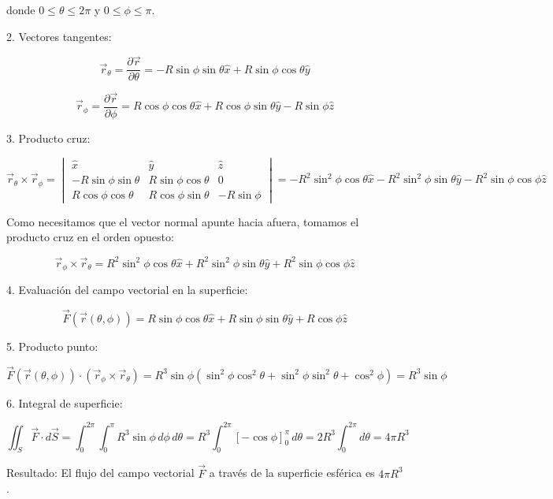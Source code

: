 \documentclass{article}
\begin{document}
donde $0 \le \theta \le 2\pi$ y $0 \le \phi \le \pi$.

2. Vectores tangentes:

\[
\vec{r}_\theta = \frac{\partial \vec{r}}{\partial \theta} = -R\sin\phi\sin\theta\hat{x} + R\sin\phi\cos\theta\hat{y}
\]

\[
\vec{r}_\phi = \frac{\partial \vec{r}}{\partial \phi} = R\cos\phi\cos\theta\hat{x} + R\cos\phi\sin\theta\hat{y} - R\sin\phi\hat{z}
\]

3. Producto cruz:

\[
\vec{r}_\theta \times \vec{r}_\phi =  \begin{vmatrix}
\hat{x} & \hat{y} & \hat{z} \\
-R\sin\phi\sin\theta & R\sin\phi\cos\theta & 0 \\
R\cos\phi\cos\theta & R\cos\phi\sin\theta & -R\sin\phi
\end{vmatrix} = -R^2\sin^2\phi\cos\theta\hat{x} - R^2\sin^2\phi\sin\theta\hat{y} - R^2\sin\phi\cos\phi\hat{z}
\]

Como necesitamos que el vector normal apunte hacia afuera, tomamos el producto cruz en el orden opuesto:

\[
\vec{r}_\phi \times \vec{r}_\theta = R^2\sin^2\phi\cos\theta\hat{x} + R^2\sin^2\phi\sin\theta\hat{y} + R^2\sin\phi\cos\phi\hat{z}
\]

4. Evaluación del campo vectorial en la superficie:

\[
\vec{F}(\vec{r}(\theta, \phi)) = R\sin\phi\cos\theta\hat{x} + R\sin\phi\sin\theta\hat{y} + R\cos\phi\hat{z}
\]

5. Producto punto:

\[
\vec{F}(\vec{r}(\theta,\phi)) \cdot (\vec{r}_\phi \times \vec{r}_\theta) = R^3\sin\phi(\sin^2\phi\cos^2\theta + \sin^2\phi\sin^2\theta + \cos^2\phi) = R^3\sin\phi
\]

6. Integral de superficie:

\[
\iint_S \vec{F} \cdot d\vec{S} = \int_0^{2\pi} \int_0^{\pi} R^3\sin\phi \, d\phi \, d\theta = R^3 \int_0^{2\pi} [-\cos\phi]_0^{\pi} \, d\theta = 2R^3 \int_0^{2\pi} d\theta = 4\pi R^3
\]

Resultado: El flujo del campo vectorial $\vec{F}$ a través de la superficie esférica es $4\pi R^3$.
\end{document}
